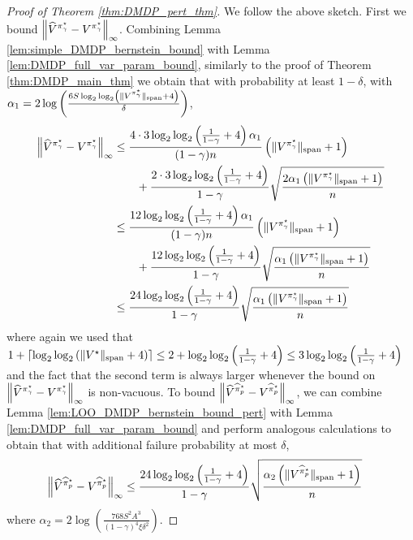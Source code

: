 \documentclass{article}
\theoremstyle{plain}
\theoremstyle{plain}
\theoremstyle{remark}
\theoremstyle{plain}
\theoremstyle{plain}
\newcommand{\Vhat}{\widehat{V}}
\newcommand{\pistar}{\pi^\star}
\newcommand{\pihat}{\widehat{\pi}}
\newcommand{\pihatpert}{\pihat^\star_p}
\begin{document}
\begin{proof}[Proof of Theorem \ref{thm:DMDP_pert_thm}]
    We follow the above sketch. First we bound $ \infnorm{ \Vhat^{\pistar_\gamma} - V^{\pistar_\gamma}} $. Combining Lemma \ref{lem:simple_DMDP_bernstein_bound} with Lemma \ref{lem:DMDP_full_var_param_bound}, similarly to the proof of Theorem \ref{thm:DMDP_main_thm} we obtain that with probability at least $1-\delta$, with $\alpha_1 = 2 \log \left( \frac{6 S \log_2 \log_2 \left(\spannorm{V^{\pistar_\gamma}}+4 \right)}{\delta} \right)$,
    \begin{align}
        \infnorm{ \Vhat^{\pistar_\gamma} - V^{\pistar_\gamma}} &\leq \frac{4 \cdot 3 \log_2 \log_2 \left( \frac{1}{1-\gamma} + 4\right) \alpha_1}{(1-\gamma)n} \left( \spannorm{V^{\pistar_\gamma}} + 1\right) \nonumber\\
        & \quad \quad  + \frac{2 \cdot 3 \log_2 \log_2 \left( \frac{1}{1-\gamma} + 4\right)}{1-\gamma} \sqrt{\frac{2 \alpha_1 \left( \spannorm{V^{\pistar_\gamma}} + 1\right)}{n}} \nonumber\\
        &\leq \frac{12 \log_2 \log_2 \left( \frac{1}{1-\gamma} + 4\right) \alpha_1}{(1-\gamma)n} \left( \spannorm{V^{\pistar_\gamma}} + 1\right) \nonumber\\
        & \quad \quad  + \frac{12 \log_2 \log_2 \left( \frac{1}{1-\gamma} + 4\right) }{1-\gamma} \sqrt{\frac{ \alpha_1 \left( \spannorm{V^{\pistar_\gamma}} + 1\right)}{n}} \nonumber \\
        & \leq \frac{24 \log_2 \log_2 \left( \frac{1}{1-\gamma} + 4\right)  }{1-\gamma}\sqrt{\frac{ \alpha_1 \left( \spannorm{V^{\pistar_\gamma}} + 1\right)}{n}}\label{eq:DMDP_pert_thm_eval_bound}
    \end{align}
    where again we used that $1+\left\lceil\log_2 \log_2 \left( \Vert V^\star\Vert _{\textnormal{span}} + 4\right) \right\rceil \leq 2 + \log_2 \log_2 \left( \frac{1}{1-\gamma} + 4\right) \leq 3 \log_2 \log_2 \left( \frac{1}{1-\gamma} + 4\right)$ and the fact that the second term is always larger whenever the bound on $\infnorm{ \Vhat^{\pistar_\gamma} - V^{\pistar_\gamma}}$ is non-vacuous.
    To bound $\infnorm{\Vhat^{\pihatpert}  - V^{\pihatpert}}$, we can combine Lemma \ref{lem:LOO_DMDP_bernstein_bound_pert} with Lemma \ref{lem:DMDP_full_var_param_bound} and perform analogous calculations to obtain that with additional failure probability at most $\delta$,
    \begin{align}
        \infnorm{\Vhat^{\pihatpert}  - V^{\pihatpert}} & \leq \frac{24 \log_2 \log_2 \left( \frac{1}{1-\gamma} + 4\right)  }{1-\gamma}\sqrt{\frac{ \alpha_2 \left( \spannorm{V^{\pihatpert}} + 1\right)}{n}}\label{eq:DMDP_pert_thm_opt_bound}
    \end{align}
    where $\alpha_2 = 2 \log \left(\frac{768 S^2A^3}{(1-\gamma)^4 \xi \delta^2} \right)$.


\end{proof}
\end{document}
